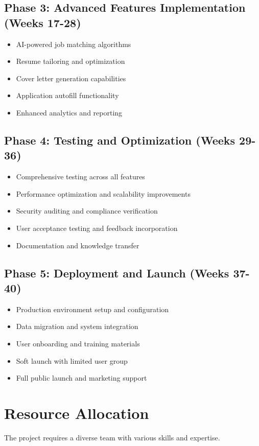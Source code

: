 \documentclass[12pt,a4paper]{report}
\begin{document}
\subsection{Phase 3: Advanced Features Implementation (Weeks 17-28)}
\begin{itemize}[leftmargin=2em]
  \item AI-powered job matching algorithms
  \item Resume tailoring and optimization
  \item Cover letter generation capabilities
  \item Application autofill functionality
  \item Enhanced analytics and reporting
\end{itemize}

\subsection{Phase 4: Testing and Optimization (Weeks 29-36)}
\begin{itemize}[leftmargin=2em]
  \item Comprehensive testing across all features
  \item Performance optimization and scalability improvements
  \item Security auditing and compliance verification
  \item User acceptance testing and feedback incorporation
  \item Documentation and knowledge transfer
\end{itemize}

\subsection{Phase 5: Deployment and Launch (Weeks 37-40)}
\begin{itemize}[leftmargin=2em]
  \item Production environment setup and configuration
  \item Data migration and system integration
  \item User onboarding and training materials
  \item Soft launch with limited user group
  \item Full public launch and marketing support
\end{itemize}

\section{Resource Allocation}
The project requires a diverse team with various skills and expertise.
\end{document}
